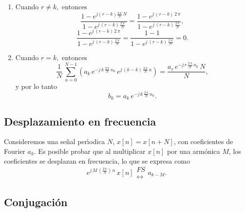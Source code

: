 \begin{enumerate}
\item Cuando $r\neq k,$ entonces
\begin{equation}
\frac{1-e^{j\left( r-k\right) \frac{2 \, \pi }{N} \, N}}{1-e^{j \, \left(r-k\right) \,
\frac{2 \, \pi }{N}}}
=
\frac{1-e^{j \, \left( r-k\right) \, 2 \, \pi }}{1-e^{j \, \left(
r-k\right) \, \frac{2 \, \pi }{N}}},
\end{equation}
\begin{equation}
\frac{1-e^{j \, \left( r-k\right) \, 2 \, \pi }}{1-e^{j \, \left( r-k\right) \, \frac{2 \, \pi }{N}}}
=
\frac{1-1}{1-e^{j \, \left( r-k\right) \, \frac{2 \, \pi }{N}}}
=0.
\end{equation}

\item Cuando $r=k,$ entonces 
\begin{equation}
\frac{1}{N} \, \sum_{n=0}^{N-1}\left(
a_{k} \, e^{-j \, k \, \frac{2 \, \pi }{N} \, n_{0}} \, 
e^{j \, \left(k-k\right) \, \frac{2 \, \pi }{N} \, n}\right) =
\frac{a_{r} \, e^{-j \, r \, \frac{2 \, \pi }{N} \, n_{0}} \, N}{N},
\end{equation}
y por lo tanto 
\begin{equation}
b_{k}=a_{k} \, e^{-j \, k \, \frac{2 \, \pi }{N} \, n_{0}}.
\end{equation}

\end{enumerate}

\subsection{Desplazamiento en frecuencia}

Consideremos una se\~{n}al per\'{\i}odica $N$, $x\left[ n\right]
=x\left[ n+N\right]$, con coeficientes de Fourier $a_{k}$. 
Es posible probar que al multiplicar $x[n]$ por una arm\'{o}nica $M$, los
coeficientes se desplazan en frecuencia, lo que se expresa como
\begin{equation}
e^{j \, M \, \left( \frac{2 \, \pi }{N}\right) \, n} \, x\left[ n\right] 
\begin{array}{l}
FS \\ 
\longleftrightarrow
\end{array}
a_{k-M}.
\end{equation}

\subsection{Conjugaci\'{o}n}


